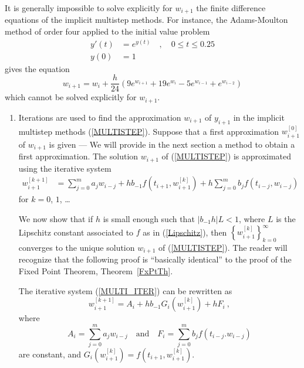\begin{egg}
It is generally impossible to solve explicitly for $w_{i+1}$ the
finite difference equations of the implicit multistep methods.  For instance,
the Adams-Moulton method of order four applied to the initial value
problem
\begin{align*}
y'(t) &= e^{y(t)} \quad, \quad 0\leq t \leq 0.25 \\
y(0) &= 1
\end{align*}
gives the equation
\[
w_{i+1} = w_i + \frac{h}{24}\left(9e^{w_{i+1}} + 19e^{w_i} -
  5e^{w_{i-1}} + e^{w_{i-2}} \right)
\]
which cannot be solved explicitly for $w_{i+1}$.
\end{egg}

\begin{rmkList}
\begin{enumerate}
\item Iterations are used to find the approximation $w_{i+1}$ of
$y_{i+1}$ in the implicit multistep methods (\ref{MULTISTEP}).
Suppose that a first approximation
$\displaystyle w_{i+1}^{[0]}$ of $w_{i+1}$ is given
--- We will provide in the next section a method to obtain a first
approximation.  The solution $w_{i+1}$ of (\ref{MULTISTEP}) is
approximated using the iterative system
\begin{equation} \label{MULTI_ITER}
\begin{split}
w_{i+1}^{[k+1]} &= \sum_{j=0}^m a_j w_{i-j}
+ h b_{-1} f\left(t_{i+1}, w_{i+1}^{[k]}\right)
+ h \sum_{j=0}^m  b_{j} f(t_{i-j}, w_{i-j})
\end{split}
\end{equation}
for $k=0$, $1$, \ldots

We now show that if $h$ is small enough such that $|b_{-1}h| L <1$,
where $L$ is the Lipschitz constant associated to $f$ as in
(\ref{Lipschitz}), then
$\displaystyle \left\{ w_{i+1}^{[k]}\right\}_{k=0}^\infty$ converges
to the unique solution $w_{i+1}$ of (\ref{MULTISTEP}).  The reader
will recognize that the following proof is ``basically identical'' to
the proof of the Fixed Point Theorem, Theorem~\ref{FxPtTh}.

The iterative system (\ref{MULTI_ITER}) can be rewritten as
\begin{equation} \label{MultistepSF}
w_{i+1}^{[k+1]} = A_i + h b_{-1} G_i\left(w_{i+1}^{[k]}\right) + h F_i \ ,
\end{equation}
where
\[
  A_i = \sum_{j=0}^m a_j w_{i-j} \quad \text{and} \quad
  F_i = \sum_{j=0}^m b_j f(t_{i-j}.w_{i-j})
\]
are constant, and
$\displaystyle G_i\left(w_{i+1}^{[k]}\right)
= f\left(t_{i+1},w_{i+1}^{[k]}\right)$.


\end{enumerate}
\end{rmkList}

